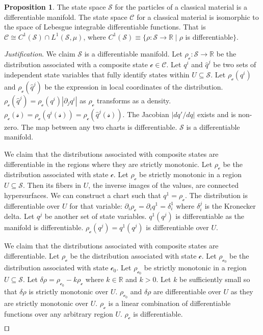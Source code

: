 \documentclass[smallextended]{svjour3}
\numberwithin{equation}{section}
\newenvironment{justification}{\emph{Justification}.}{\hfill\(\qed\)}
\theoremstyle{definition}
\newtheorem{prop}[equation]{Proposition}
\newenvironment{justification}{\emph{Justification}.}{\qed}
\begin{document}
\begin{prop}\label{prop:differentiable_manifold}
	The state space $\mathcal{S}$ for the particles of a  classical material is a differentiable manifold. The state space $\mathcal{C}$ for a classical material is isomorphic to the space of Lebesgue integrable differentiable functions. That is $\mathcal{C} \cong C^1(\mathcal{S}) \cap L^1(\mathcal{S}, \mu)$, where $C^1(\mathcal{S}) \equiv \{\rho:\mathcal{S} \rightarrow \mathbb{R} \; | \; \rho$ is differentiable$\}$.
\end{prop}
\begin{justification}
	We claim $\mathcal{S}$ is a differentiable manifold. Let $\rho_\mathcal{c} : \mathcal{S} \rightarrow \mathbb{R}$ be the distribution associated with a composite state $\mathcal{c} \in \mathcal{C}$. Let $q^i$ and $\hat{q}^j$ be two sets of independent state variables that fully identify states within $U\subseteq \mathcal{S}$. Let $\rho_\mathcal{c}(q^i)$ and $\rho_\mathcal{c}(\hat{q}^j)$ be the expression in local coordinates of the distribution.  $\rho_\mathcal{c}(\hat{q}^j)=\rho_\mathcal{c}(q^i) | \partial_j q^i |$ as $\rho_\mathcal{c}$ transforms as a density. $\rho_\mathcal{c}(\mathcal{s}) = \rho_\mathcal{c}(q^i(\mathcal{s})) = \rho_\mathcal{c}(\hat{q}^j(\mathcal{s}))$. The Jacobian $| d q' / d q |$ exists and is non-zero. The map between any two charts is differentiable. $\mathcal{S}$ is a differentiable manifold.
	
	We claim that the distributions associated with composite states are differentiable in the regions where they are strictly monotonic. Let $\rho_\mathcal{c}$ be the distribution associated with state $\mathcal{c}$. Let $\rho_\mathcal{c}$ be strictly monotonic in a region $U\subseteq \mathcal{S}$. Then its fibers in $U$, the inverse images of the values, are connected hypersurfaces. We can construct a chart such that $q^1=\rho_\mathcal{c}$. The distribution is differentiable over $U$ for that variable: $\partial_{i} \rho_\mathcal{c} = \partial_{i} q^1 = \delta_i^1$ where $\delta_i^j$ is the Kronecker delta. Let $q^{j}$ be another set of state variables. $q^1(q^{j})$ is differentiable as the manifold is differentiable. $\rho_\mathcal{c}(q^{j})=q^1(q^{j})$ is differentiable over $U$.
	
	We claim that the distributions associated with composite states are differentiable. Let $\rho_\mathcal{c}$ be the distribution associated with state $\mathcal{c}$. Let $\rho_{\mathcal{c}_0}$ be the distribution associated with state $\mathcal{c}_0$. Let $\rho_{\mathcal{c}_0}$ be strictly monotonic in a region $U\subseteq \mathcal{S}$. Let $\delta \rho = \rho_{\mathcal{c}_0} - k \rho_{\mathcal{c}}$ where $k \in \mathbb{R}$ and $k>0$. Let $k$ be sufficiently small so that $\delta \rho$ is strictly monotonic over $U$. $\rho_{\mathcal{c}_0}$ and $\delta \rho$ are differentiable over $U$ as they are strictly monotonic over $U$. $\rho_{\mathcal{c}}$ is a linear combination of differentiable functions over any arbitrary region $U$. $\rho_{\mathcal{c}}$ is differentiable.
	

\end{justification}
\end{document}
